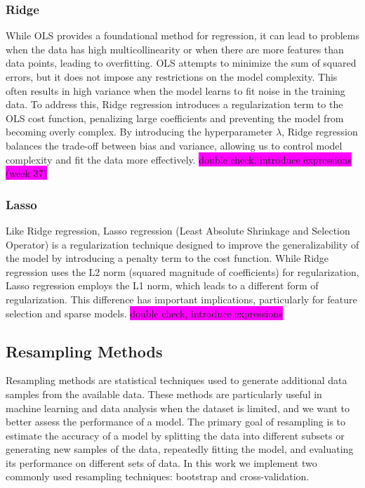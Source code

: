 \documentclass[aps,pra,english,notitlepage,reprint,nofootinbib]{revtex4-1}  %
\begin{document}
\subsubsection{Ridge}\label{subsubsec:ridge} 
While OLS provides a foundational method for regression, it can lead to problems when the data has high multicollinearity or when there are more features than data points, leading to overfitting. OLS attempts to minimize the sum of squared errors, but it does not impose any restrictions on the model complexity. This often results in high variance when the model learns to fit noise in the training data. To address this, Ridge regression introduces a regularization term to the OLS cost function, penalizing large coefficients and preventing the model from becoming overly complex. By introducing the hyperparameter $\lambda$, Ridge regression balances the trade-off between bias and variance, allowing us to control model complexity and fit the data more effectively. \colorbox{magenta}{double check, introduce expressions (week 37)}


\subsubsection{Lasso}\label{subsubsec:lasso} 
Like Ridge regression, Lasso regression (Least Absolute Shrinkage and Selection Operator) is a regularization technique designed to improve the generalizability of the model by introducing a penalty term to the cost function. While Ridge regression uses the L2 norm (squared magnitude of coefficients) for regularization, Lasso regression employs the L1 norm, which leads to a different form of regularization. This difference has important implications, particularly for feature selection and sparse models. \colorbox{magenta}{double check, introduce expressions}


\subsection{Resampling Methods}
Resampling methods are statistical techniques used to generate additional data samples from the available data. These methods are particularly useful in machine learning and data analysis when the dataset is limited, and we want to better assess the performance of a model. The primary goal of resampling is to estimate the accuracy of a model by splitting the data into different subsets or generating new samples of the data, repeatedly fitting the model, and evaluating its performance on different sets of data. In this work we implement two commonly used resampling techniques: bootstrap and cross-validation.
\end{document}

